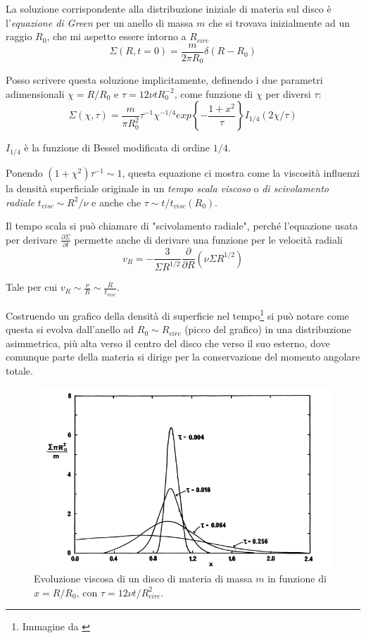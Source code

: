 \documentclass[a4paperbi]{article}
\begin{document}
	La soluzione corrispondente alla distribuzione iniziale di materia sul disco è l'\textit{equazione di Green} per un anello di massa $m$ che si trovava inizialmente ad un raggio $R_0$, che mi aspetto essere intorno a $R_{circ}$
	\begin{equation}
		\Sigma(R,t=0)=\frac{m}{2\pi R_0}\delta(R-R_0)
	\end{equation}
	
	Posso scrivere questa soluzione implicitamente, definendo i due parametri adimensionali $\chi=R/R_0$ e $\tau=12\nu tR_0^{-2}$, come funzione di $\chi$ per diversi $\tau$:
	\begin{equation}
	\Sigma(\chi,\tau)=\frac{m}{\pi R_0^2}\tau^{-1}\chi^{-1/4}exp\left\{-\frac{1+x^2}{\tau}\right\}I_{1/4}(2\chi/\tau)
	\end{equation}
	
	$I_{1/4}$ è la funzione di Bessel modificata di ordine $1/4$.
	
	Ponendo $(1+\chi^2)\tau^{-1}\sim 1$, questa equazione ci mostra come la viscosità influenzi la densità superficiale originale in un \textit{tempo scala viscoso} o \textit{di scivolamento radiale} $t_{visc}\sim R^2/\nu$ e anche che $\tau\sim t/t_{visc}(R_0)$.
	
	Il tempo scala si può chiamare di "scivolamento radiale", perché l'equazione usata per derivare $\frac{\partial\Sigma}{\partial t}$ permette anche di derivare una funzione per le velocità radiali
	\begin{equation}
		v_R=-\frac{3}{\Sigma R^{1/2}}\frac{\partial}{\partial R}(\nu\Sigma R^{1/2})
	\end{equation}
	
	Tale per cui $v_R\sim\frac{\nu}{R}\sim\frac{R}{t_{visc}}$.
	
	Costruendo un grafico della densità di superficie nel tempo\footnote{Immagine da \cite{Pringle1981}} si può notare come questa si evolva dall'anello ad $R_0\sim R_{circ}$ (picco del grafico) in una distribuzione asimmetrica, più alta verso il centro del disco che verso il suo esterno, dove comunque parte della materia si dirige per la conservazione del momento angolare totale.
	
	\begin{figure}[H]
		\centering
		\includegraphics[width=0.9\linewidth]{DensSuper}
		\caption{Evoluzione viscosa di un disco di materia di massa $m$ in funzione di $x=R/R_0$, con $\tau=12\nu t/R_{circ}^2$.}
		\label{fig:denssuper}
	\end{figure}
\end{document}
